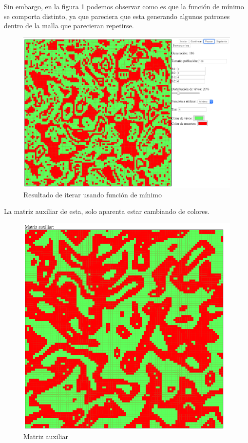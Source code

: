 	Sin embargo, en la figura \ref{fig:golm4} podemos observar como es que la función de mínimo se comporta distinto, ya que pareciera que esta generando algunos patrones dentro de la malla que parecieran repetirse.
	\begin{figure}[H]
		\begin{center}
			\includegraphics[scale=.3]{GOLM/img/regla2746-2.png}
			\caption{Resultado de iterar usando función de mínimo}
			\label{fig:golm4}
		\end{center}
	\end{figure}

	La matriz auxiliar de esta, solo aparenta estar cambiando de colores.
	\begin{figure}[H]
		\begin{center}
			\includegraphics[scale=.3]{GOLM/img/regla2746-2-1.png}
			\caption{Matriz auxiliar}
			\label{fig:golm5}
		\end{center}
	\end{figure}


